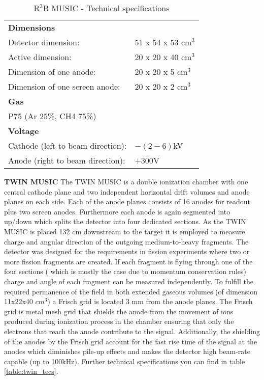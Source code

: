 \begin{table}[h!]
    \centering
    \begin{tabular}{ll}
        \hline
        \textbf{Dimensions} & \\ 
	Detector dimension: & 51 x 54 x 53 cm$^3$ \\ 
	Active dimension: & 20 x 20 x 40 cm$^3$\\
	Dimension of one anode:& 20 x 20 x 5 cm$^3$\\
	Dimension of one screen anode:& 20 x 20 x 2 cm$^3$\\
	\textbf{Gas} &\\
	P75 (Ar 25\%, CH4 75\%) \\
	\textbf{Voltage} & \\
	Cathode (left to beam direction): &  $-(2-6)$kV \\
	Anode (right to beam direction): & $+300$V \\
	\hline
    \end{tabular}
    \caption{R$^3$B MUSIC - Technical specifications}
	\label{table:r3bmusic_tecs}
\end{table}
\newline
\textbf{TWIN MUSIC}\newline
The TWIN MUSIC is a double ionization chamber with one central cathode plane and two independent horizontal drift volumes and anode planes on each side. Each of the anode planes consists of 16 anodes for readout plus two screen anodes. Furthermore each anode is again segmented into up/down which splits the detector into four dedicated sections. As the TWIN MUSIC is placed 132 cm downstream to the target it is employed to measure charge and angular direction of the outgoing medium-to-heavy fragments. The detector was designed for the requirements in fission experiments where two or more fission fragments are created. If each fragment is flying through one of the four sections ( which is mostly the case due to momentum conservation rules) charge and angle of each fragment can be measured independently.\newline
To fulfill the required permanence of the field in both extended gaseous volumes (of dimension 11x22x40 $cm^3$) a Frisch grid is located 3 mm from the anode planes. The Frisch grid is metal mesh grid that shields the anode from the movement of ions produced during ionization process in the chamber ensuring that only the electrons that reach the anode contribute to the signal. Additionally, the shielding of the anodes by the Frisch grid account for the fast rise time of the signal at the anodes which diminishes pile-up effects and makes the detector high beam-rate capable (up to 100kHz). Further technical specifications you can find in table \ref{table:twin_tecs}.
